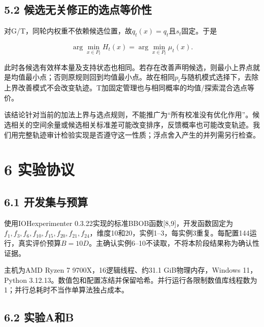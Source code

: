 \documentclass[11pt,a4paper]{article}
\begin{document}
\begin{samepage}

\hypertarget{ux5019ux9009ux65e0ux5173ux4feeux6b63ux7684ux9009ux70b9ux7b49ux4ef7ux6027}{%
\subsection{5.2
候选无关修正的选点等价性}\label{ux5019ux9009ux65e0ux5173ux4feeux6b63ux7684ux9009ux70b9ux7b49ux4ef7ux6027}}

对G/T，同轮内权重不依赖候选位置，故\(q_t(x)=q_t\)且\(s_t\)固定。于是

\[
\arg\min_{x\in P_t} H_t(x)=\arg\min_{x\in P_t}\mu_t(x).
\]

\end{samepage}

此时各候选有效样本量及支持状态也相同。若存在改善声明候选，则最小上界点就是均值最小点；否则原规则回到均值最小点。故在相同\(p_t\)与随机模式选择下，去除上界改善模式不会改变轨迹。T加固定管理也与相同概率的均值/探索混合选点等价。

该结论针对当前的加法上界与选点规则，不能推广为``所有校准没有优化作用''。候选相关的空间余量或候选相关标准差可能改变排序，反馈概率也可能改变轨迹。我们用完整轨迹审计检验实现是否遵守这一性质；浮点舍入产生的并列需另行检查。

\hypertarget{ux5b9eux9a8cux534fux8bae}{%
\section{6 实验协议}\label{ux5b9eux9a8cux534fux8bae}}

\hypertarget{ux5f00ux53d1ux96c6ux4e0eux9884ux7b97}{%
\subsection{6.1
开发集与预算}\label{ux5f00ux53d1ux96c6ux4e0eux9884ux7b97}}

使用IOHexperimenter
0.3.22实现的标准BBOB函数{[}8,9{]}，开发函数固定为\(f_1,f_3,f_6,f_{10},f_{15},f_{20},f_{21},f_{24}\)，维度10和20，实例1--3，每实例3重复。每配置144运行，真实评价预算\(B=10D\)。主确认实例6--10不读取，不将本阶段结果称为确认性证据。

主机为AMD Ryzen 7 9700X，16逻辑线程、约31.1 GiB物理内存，Windows
11，Python
3.12.13。数值包和配置冻结并保留哈希。并行运行各限制数值库线程数为1；并行总耗时不当作单算法独占成本。

\hypertarget{ux5b9eux9a8caux548cb}{%
\subsection{6.2 实验A和B}\label{ux5b9eux9a8caux548cb}}
\end{document}
